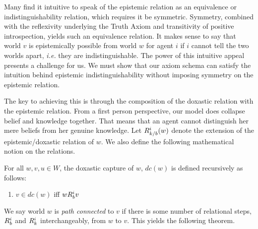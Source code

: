 Many find it intuitive to speak of the epistemic relation as an equivalence or indistinguishability relation, which requires it be symmetric. Symmetry, combined with the reflexivity underlying the Truth Axiom and transitivity of positive introspection, yields such an equivalence relation. It makes sense to say that world $v$ is epistemically possible from world $w$ for agent $i$ if $i$ cannot tell the two worlds apart, \emph{i.e.} they are indistinguishable. The power of this intuitive appeal presents a challenge for us. We must show that our axiom schema can satisfy the intuition behind epistemic indistinguishability without imposing symmetry on the epistemic relation.

The key to achieving this is through the composition of the doxastic relation with the epistemic relation. From a first person perspective, our model does collapse belief and knowledge together. That means that an agent cannot distinguish her mere beliefs from her genuine knowledge. Let $R_{k/b}^i(w)$ denote the extension of the epistemic/doxastic relation of $w$. We also define the following mathematical notion on the relations.

\begin{definition}
	For all $w,v,u\in W$, the doxastic capture of $w$, $dc(w)$ is defined recursively as follows:
	\begin{enumerate}
		\item $v\in dc(w)$ iff $wR_{b}^iv$
	\end{enumerate}
\end{definition}

We say world $w$ is \emph{path connected} to $v$ if there is some number of relational steps, $R_{b}^i$ and $R_{k}^i$ interchangeably, from $w$ to $v$. This yields the following theorem.

